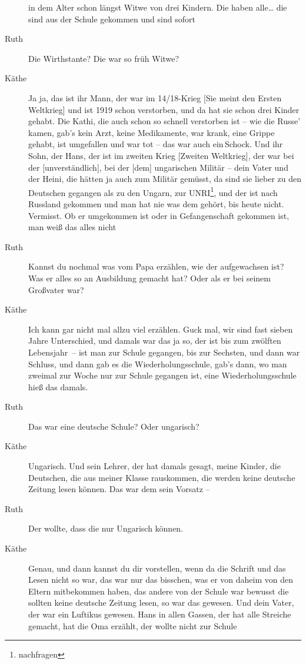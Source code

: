 \documentclass[ngerman,]{article}
\begin{document}
\begin{multicols}{2}
\begin{description}
in dem Alter schon längst Witwe von drei Kindern. Die haben alle\ldots{}
die sind aus der Schule gekommen und sind sofort
\item[Ruth]
Die Wirthstante? Die war so früh Witwe?
\item[Käthe]
Ja ja, das ist ihr Mann, der war im 14/18-Krieg {[}Sie meint den Ersten
Weltkrieg{]} und ist 1919 schon verstorben, und da hat sie schon drei
Kinder gehabt. Die Kathi, die auch schon so schnell verstorben ist – wie
die Russe' kamen, gab's kein Arzt, keine Medikamente, war krank, eine
Grippe gehabt, ist umgefallen und war tot – das war auch ein\,Schock.
Und ihr Sohn, der Hans, der ist im zweiten Krieg {[}Zweiten
Weltkrieg{]}, der war bei der {[}unverständlich{]}, bei der {[}dem{]}
ungarischen Militär – dein Vater und der Heini, die hätten ja auch zum
Militär gemüsst, da sind sie lieber zu den Deutschen gegangen als zu den
Ungarn, zur UNRI\footnote{nachfragen}, und der ist nach Russland
gekommen und man hat nie was dem gehört, bis heute nicht. Vermisst. Ob
er umgekommen ist oder in Gefangenschaft gekommen ist, man weiß das
alles nicht
\item[Ruth]
Kannst du nochmal was vom Papa erzählen, wie der aufgewachsen ist? Was
er alles so an Ausbildung gemacht hat? Oder als er bei seinem Großvater
war?
\item[Käthe]
Ich kann gar nicht mal allzu viel erzählen. Guck mal, wir sind fast
sieben Jahre Unterschied, und damals war das ja so, der ist bis zum
zwölften Lebensjahr~– ist man zur Schule gegangen, bis zur Sechsten, und
dann war Schluss, und dann gab es die Wiederholungsschule, gab's dann,
wo man zweimal zur Woche nur zur Schule gegangen ist, eine
Wiederholungsschule hieß das damals.
\item[Ruth]
Das war eine deutsche Schule? Oder ungarisch?
\item[Käthe]
Ungarisch. Und sein Lehrer, der hat damals gesagt, meine Kinder, die
Deutschen, die aus meiner Klasse rauskommen, die werden keine deutsche
Zeitung lesen können. Das war dem sein Vorsatz –
\item[Ruth]
Der wollte, dass die nur Ungarisch können.
\item[Käthe]
Genau, und dann kannst du dir vorstellen, wenn da die Schrift und das
Lesen nicht so war, das war nur das bisschen, was er von daheim von
den\,Eltern mitbekommen haben, das andere von der Schule war bewusst die
sollten keine deutsche Zeitung lesen, so war das gewesen. Und dein
Vater, der war ein Luftikus gewesen. Hans in allen Gassen, der hat alle
Streiche gemacht, hat die Oma erzählt, der wollte nicht zur Schule

\end{description}
\end{multicols}
\end{document}
